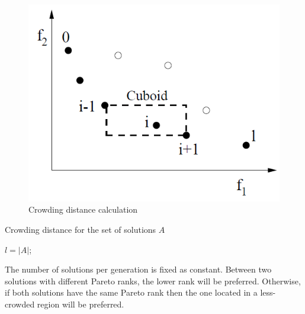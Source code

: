 \begin{figure}[h!]
\begin{center}
\includegraphics[width=0.6\linewidth]{crowdingdist}
\end{center}
\caption{Crowding distance calculation \cite{Deb00afast}}
\label{fig:crowding_dist}
\end{figure}

\begin{algorithm}[h!]
\caption{Crowding distance for the set of solutions $A$ \cite{Deb00afast}}
\label{alg:crowding_dist}
$l = |A|$;\\
 
\end{algorithm}

The number of solutions per generation is fixed as constant. Between two solutions with different Pareto ranks, the lower rank will be preferred. Otherwise, if both solutions have the same Pareto rank then the one located in a less-crowded region will be preferred.

